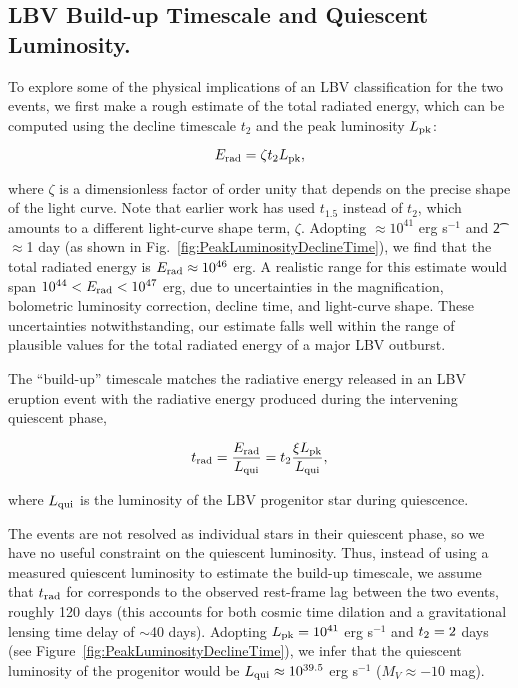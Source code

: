 \subsection{LBV Build-up Timescale and Quiescent Luminosity.}\label{sec:LBVbuildup}

To explore some of the physical implications of an LBV classification
for the two \spock events, we first make a rough estimate of the total
radiated energy, which can be computed using the decline timescale
$t_2$ and the peak luminosity $L_{\rm pk}$:

\begin{equation}
  \label{eqn:Erad}
  E_{\rm rad} = \zeta \t2 \Lpk,
\end{equation}

\noindent where $\zeta$ is a dimensionless factor of order unity that
depends on the precise shape of the light
curve\cite{Smith:2011b}. Note that earlier work\cite{Smith:2011b} has
used $t_{1.5}$ instead of $t_2$, which amounts to a different
light-curve shape term, $\zeta$.  Adopting \Lpk$\approx10^{41}$ erg
s$^{-1}$ and \t2$\approx$1 day (as shown in
Fig.~\ref{fig:PeakLuminosityDeclineTime}), we find that the total
radiated energy is $E_{\rm rad}\approx10^{46}$ erg.  A realistic range
for this estimate would span $10^{44}<E_{\rm rad}<10^{47}$ erg, due to
uncertainties in the magnification, bolometric luminosity correction,
decline time, and light-curve shape. These uncertainties
notwithstanding, our estimate falls well within the range of plausible
values for the total radiated energy of a major LBV outburst.

The ``build-up'' timescale\citep{Smith:2011b} matches the radiative
energy released in an LBV eruption event with the radiative energy
produced during the intervening quiescent phase,

\begin{equation}
  \label{eqn:trad}
t_{\rm rad} = \frac{E_{\rm rad}}{L_{\rm qui}} = \t2 \frac{\xi\Lpk}{L_{\rm qui}},
\end{equation}

\noindent where $L_{\rm qui}$ is the luminosity of the LBV progenitor
star during quiescence.

The \spock events are not resolved as individual stars in their
quiescent phase, so we have no useful constraint on the quiescent
luminosity. Thus, instead of using a measured quiescent luminosity to
estimate the build-up timescale, we assume that $t_{\rm rad}$ for
\spock corresponds to the observed rest-frame lag between the two
events, roughly 120 days (this accounts for both cosmic time dilation
and a gravitational lensing time delay of $\sim$40 days). Adopting
$L_{\rm pk}=10^{41}$ erg s$^{-1}$ and $\t2=2$ days (see
Figure~\ref{fig:PeakLuminosityDeclineTime}), we infer that the
quiescent luminosity of the \spock progenitor would be
$L_{\rm qui}\approx10^{39.5}$ erg s$^{-1}$ ($M_V\approx-10$ mag).



